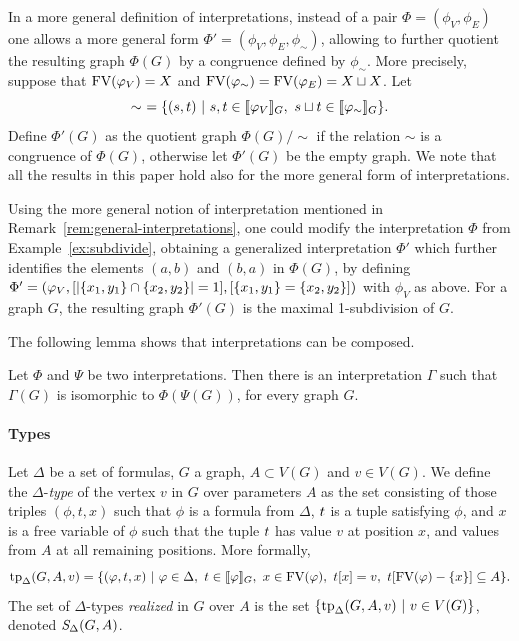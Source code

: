 \begin{remark}\label{rem:general-interpretations}
  In a more general definition of interpretations,
  instead of a pair $\Phi=(\phi_V,\phi_E)$
  one allows a more general form  $\Phi'=(\phi_V,\phi_E,\phi_\sim)$, allowing to further quotient the resulting graph $\Phi(G)$ by a congruence defined by $\phi_\sim$. More precisely,
  suppose that $\textrm{FV}(\varphi_V)=X$ and $\textrm{FV}(\varphi_\sim)=\textrm{FV}(\varphi_E)=X\sqcup X$.
Let
 $$\sim\ =\{(s,t)\ |\ s,t\in [\![\varphi_V]\!]_G,\ s\sqcup t\in [\![\varphi_\sim]\!]_G\}.$$
 Define $\Phi'(G)$
 as the quotient graph $\Phi(G)/{\sim}$ if the relation 
 $\sim$ is a congruence of  $\Phi(G)$, otherwise let $\Phi'(G)$ be the empty graph. 
  We note that all the results in this paper hold also for the more general form of interpretations.   
  
Using the more general notion of interpretation mentioned in Remark~\ref{rem:general-interpretations}, one could modify the interpretation $\Phi$ from Example~\ref{ex:subdivide}, obtaining a generalized interpretation $\Phi'$
which further identifies the elements $(a,b)$  and $(b,a)$
in $\Phi(G)$,
by defining $\Phi'=(\varphi_V,[|\{x_1,y_1\}\cap\{x_2,y_2\}|=1], [\{x_1,y_1\}=\{x_2,y_2\}])$ with $\phi_V$ as above.
For a graph $G$, the resulting graph $\Phi'(G)$ is the maximal 1-subdivision of $G$.
\end{remark}


The following lemma shows that interpretations can be composed.

\begin{lemma}\label{lem:interpretation-composition}
	Let $\Phi$ and $\Psi$ be two interpretations. Then there is an interpretation $\Gamma$ such that $\Gamma(G)$ is isomorphic to $\Phi(\Psi(G))$, for every graph $G$.	
\end{lemma}

\paragraph{Types}
Let  $\Delta$ be a set of formulas, $G$ a graph, $A\subset V(G)$  and $v\in V(G)$. We define the $\Delta$-\emph{type} of the vertex  $v$ in $G$ over parameters $A$ as the set consisting of those triples $(\phi,t,x)$ such that $\phi$ is a formula from $\Delta$,
 $t$ is a tuple satisfying $\phi$, and $x$ is a free variable of $\phi$
such that the tuple $t$
has value $v$ at position $x$,
and values from $A$ at all remaining positions.
More formally,
$$\tp_\Delta(G,A,v)=\setof{(\phi,\val,x)}{\phi\in\Delta,\ \val\in \sem\phi_G,\ x\in\fv(\phi),\ 
\val[x]=v,\ \val[\fv(\phi)-\set x]\subset A}.$$
The set of $\Delta$-types \emph{realized} in $G$ over $A$
is the set $\{\textrm{tp}_\Delta(G,A,v)\ |\ v\in V(G)\}$, denoted
$\textit{S}_\Delta(G,A)$.

